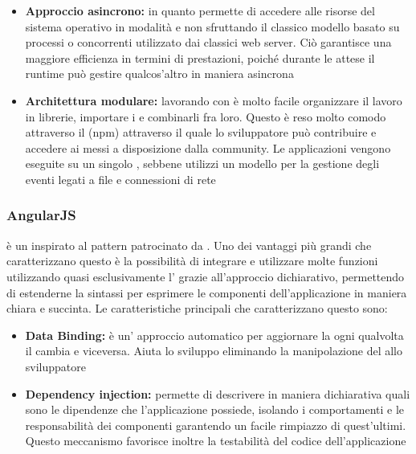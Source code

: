 \documentclass[12pt,a4paper]{article}
\begin{document}
\begin{itemize}
	\item \textbf{Approccio asincrono:} in quanto permette di accedere alle risorse del sistema operativo in modalità  e non sfruttando il classico modello basato su processi o  concorrenti utilizzato dai classici web server. Ciò garantisce una maggiore efficienza in termini di prestazioni, poiché durante le attese il runtime può gestire qualcos’altro in maniera asincrona
	\item \textbf{Architettura modulare:} lavorando con  è molto facile organizzare il lavoro in librerie, importare i  e combinarli fra loro. Questo è reso molto comodo attraverso il  (npm) attraverso il quale lo sviluppatore può contribuire e
	accedere ai  messi a disposizione dalla community.
	Le applicazioni  vengono eseguite su un singolo , sebbene  utilizzi un modello  per la gestione degli eventi legati a file e connessioni di rete
\end{itemize}

\subsubsection{AngularJS}\label{angularjs}
 è un     inspirato al pattern  patrocinato da . Uno dei vantaggi più grandi che caratterizzano questo  è la possibilità di integrare e utilizzare molte funzioni utilizzando quasi esclusivamente l’ grazie all’approccio dichiarativo, permettendo di estenderne la sintassi per esprimere le componenti dell’applicazione in maniera chiara e succinta. Le caratteristiche principali che caratterizzano questo  sono:

\begin{itemize}
	\item \textbf{Data Binding:} è un’ approccio automatico per aggiornare la  ogni qualvolta il  cambia e viceversa. Aiuta lo sviluppo eliminando la manipolazione del  allo sviluppatore
	\item \textbf{Dependency injection:} permette di descrivere in maniera dichiarativa quali sono le
	dipendenze che l’applicazione possiede, isolando i comportamenti e le responsabilità dei componenti garantendo un facile rimpiazzo di quest’ultimi. Questo meccanismo favorisce inoltre la testabilità del codice dell’applicazione	
\end{itemize}
\end{document}

